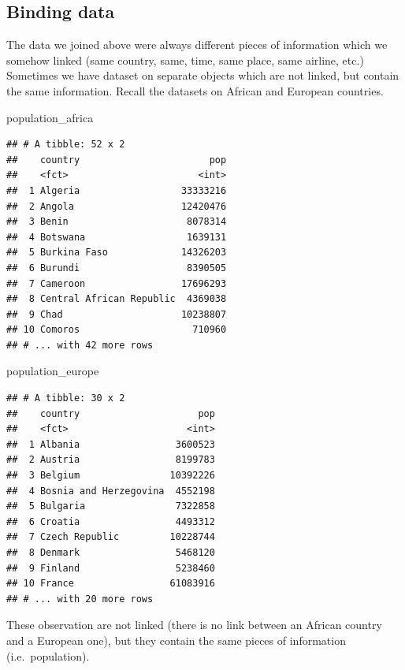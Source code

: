 \documentclass[]{tufte-book}
\newenvironment{Shaded}{}{}
\newcommand{\NormalTok}[1]{#1}
\begin{document}
\hypertarget{binding-data}{%
\subsection{Binding data}\label{binding-data}}

The data we joined above were always different pieces of information which we somehow linked (same country, same, time, same place, same airline, etc.) Sometimes we have dataset on separate objects which are not linked, but contain the same information. Recall the datasets on African and European countries.

\begin{Shaded}
\begin{Highlighting}[]
\NormalTok{population_africa}
\end{Highlighting}
\end{Shaded}

\begin{verbatim}
## # A tibble: 52 x 2
##    country                       pop
##    <fct>                       <int>
##  1 Algeria                  33333216
##  2 Angola                   12420476
##  3 Benin                     8078314
##  4 Botswana                  1639131
##  5 Burkina Faso             14326203
##  6 Burundi                   8390505
##  7 Cameroon                 17696293
##  8 Central African Republic  4369038
##  9 Chad                     10238807
## 10 Comoros                    710960
## # ... with 42 more rows
\end{verbatim}

\begin{Shaded}
\begin{Highlighting}[]
\NormalTok{population_europe}
\end{Highlighting}
\end{Shaded}

\begin{verbatim}
## # A tibble: 30 x 2
##    country                     pop
##    <fct>                     <int>
##  1 Albania                 3600523
##  2 Austria                 8199783
##  3 Belgium                10392226
##  4 Bosnia and Herzegovina  4552198
##  5 Bulgaria                7322858
##  6 Croatia                 4493312
##  7 Czech Republic         10228744
##  8 Denmark                 5468120
##  9 Finland                 5238460
## 10 France                 61083916
## # ... with 20 more rows
\end{verbatim}

These observation are not linked (there is no link between an African country and a European one), but they contain the same pieces of information (i.e.~population).
\end{document}
